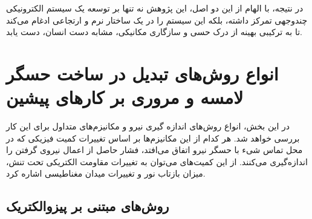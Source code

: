 در نتیجه، با الهام از این دو اصل، این  پژوهش نه تنها بر توسعه یک سیستم الکترونیکی چندوجهی تمرکز داشته، بلکه این سیستم را در یک ساختار نرم و ارتجاعی ادغام می‌کند تا به ترکیبی بهینه از درک حسی و سازگاری مکانیکی، مشابه دست انسان، دست یابد.

\section{انواع روش‌های تبدیل در ساخت حسگر لامسه و مروری بر کار‌های پیشین}
\label{sec:mechanisms}
در این بخش، انواع روش‌های اندازه گیری نیرو و مکانیزم‌های متداول برای این کار بررسی خواهد شد. هر کدام از این مکانیزم‌ها بر اساس تغییرات کمیت فیزیکی که در محل تماس شیء با حسگر نیرو اتفاق می‌افتد، فشار حاصل از اعمال نیروی گرفتن را اندازه‌گیری می‌کنند. از این کمیت‌های می‌توان به تغییرات مقاومت الکتریکی تحت تنش، میزان بازتاب نور و تغییرات میدان مغناطیسی اشاره کرد.
\subsection{روش‌های مبتنی بر پیزوالکتریک}


